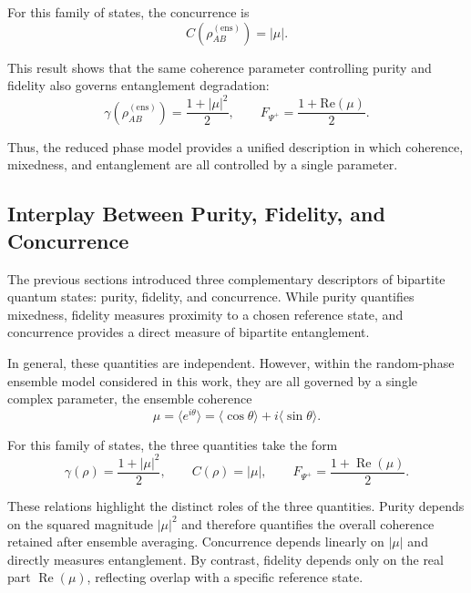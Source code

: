 \documentclass[a4paper]{article}
\begin{document}
For this family of states, the concurrence is
\[
C\!\left(\rho_{AB}^{(\mathrm{ens})}\right) = |\mu|.
\]

\medskip

This result shows that the same coherence parameter controlling purity and fidelity also governs entanglement degradation:
\[
\gamma\!\left(\rho_{AB}^{(\mathrm{ens})}\right)
=
\frac{1 + |\mu|^2}{2},
\qquad
F_{\Psi^+}
=
\frac{1 + \mathrm{Re}(\mu)}{2}.
\]

Thus, the reduced phase model provides a unified description in which coherence, mixedness, and entanglement are all controlled by a single parameter.


\subsection{Interplay Between Purity, Fidelity, and Concurrence}

The previous sections introduced three complementary descriptors of bipartite quantum states: purity, fidelity, and concurrence. While purity quantifies mixedness, fidelity measures proximity to a chosen reference state, and concurrence provides a direct measure of bipartite entanglement.

\medskip

In general, these quantities are independent. However, within the random-phase ensemble model considered in this work, they are all governed by a single complex parameter, the ensemble coherence
\[
\mu = \langle e^{i\theta} \rangle
=
\langle \cos\theta \rangle + i \langle \sin\theta \rangle.
\]

\medskip

For this family of states, the three quantities take the form
\[
\gamma(\rho) = \frac{1 + |\mu|^2}{2}, 
\qquad
C(\rho) = |\mu|, 
\qquad
F_{\Psi^+} = \frac{1 + \operatorname{Re}(\mu)}{2}.
\]

\medskip

These relations highlight the distinct roles of the three quantities. Purity depends on the squared magnitude \( |\mu|^2 \) and therefore quantifies the overall coherence retained after ensemble averaging. Concurrence depends linearly on \( |\mu| \) and directly measures entanglement. By contrast, fidelity depends only on the real part \( \operatorname{Re}(\mu) \), reflecting overlap with a specific reference state.
\end{document}
